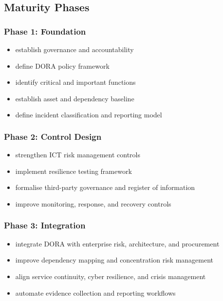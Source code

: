 \documentclass[
  letterpaper,
  DIV=11,
  numbers=noendperiod]{scrartcl}
\providecommand{\tightlist}{%
  \setlength{\itemsep}{0pt}\setlength{\parskip}{0pt}}
\begin{document}
\subsection{Maturity Phases}\label{maturity-phases}

\subsubsection{Phase 1: Foundation}\label{phase-1-foundation}

\begin{itemize}
\tightlist
\item
  establish governance and accountability
\item
  define DORA policy framework
\item
  identify critical and important functions
\item
  establish asset and dependency baseline
\item
  define incident classification and reporting model
\end{itemize}

\subsubsection{Phase 2: Control Design}\label{phase-2-control-design}

\begin{itemize}
\tightlist
\item
  strengthen ICT risk management controls
\item
  implement resilience testing framework
\item
  formalise third-party governance and register of information
\item
  improve monitoring, response, and recovery controls
\end{itemize}

\subsubsection{Phase 3: Integration}\label{phase-3-integration}

\begin{itemize}
\tightlist
\item
  integrate DORA with enterprise risk, architecture, and procurement
\item
  improve dependency mapping and concentration risk management
\item
  align service continuity, cyber resilience, and crisis management
\item
  automate evidence collection and reporting workflows
\end{itemize}
\end{document}
